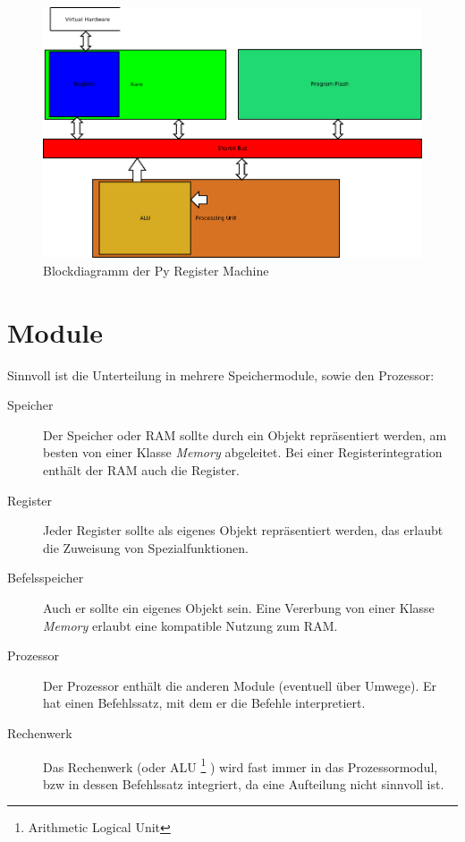 \documentclass[a4paper,12pt,oneside]{scrreprt}
\begin{document}
\begin{figure}
\centering
\includegraphics[width=\linewidth]{bloecke.png}
\caption[Blockdiagramm]{Blockdiagramm der Py Register Machine}
\label{fig:bloecke}
\end{figure}

\section{Module}

Sinnvoll ist die Unterteilung in mehrere Speichermodule, sowie den Prozessor:

\begin{description}
\item[Speicher] Der Speicher oder RAM sollte durch ein Objekt repräsentiert werden, am besten von einer Klasse \textit{Memory} abgeleitet. Bei einer Registerintegration enthält der RAM auch die Register.

\item[Register] Jeder Register sollte als eigenes Objekt repräsentiert werden, das erlaubt die Zuweisung von Spezialfunktionen.

\item[Befelsspeicher] Auch er sollte ein eigenes Objekt sein. Eine Vererbung von einer Klasse \textit{Memory} erlaubt eine kompatible Nutzung zum RAM.

\item[Prozessor] Der Prozessor enthält die anderen Module (eventuell über Umwege). Er hat einen Befehlssatz, mit dem er die Befehle interpretiert.

\item[Rechenwerk] Das Rechenwerk (oder ALU \footnote{Arithmetic Logical Unit} ) wird fast immer  in das Prozessormodul, bzw in dessen Befehlssatz integriert, da eine Aufteilung nicht sinnvoll ist.

\end{description}
\end{document}

